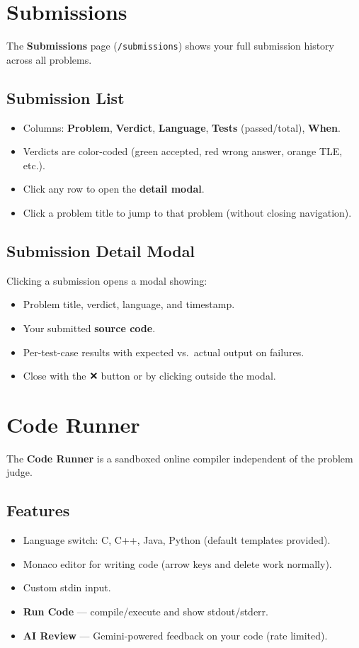 \documentclass[11pt,a4paper]{article}
\begin{document}
\section{Submissions}

The \textbf{Submissions} page (\texttt{/submissions}) shows your full submission history across all problems.

\subsection{Submission List}
\begin{itemize}[noitemsep]
  \item Columns: \textbf{Problem}, \textbf{Verdict}, \textbf{Language}, \textbf{Tests} (passed/total), \textbf{When}.
  \item Verdicts are color-coded (green accepted, red wrong answer, orange TLE, etc.).
  \item Click any row to open the \textbf{detail modal}.
  \item Click a problem title to jump to that problem (without closing navigation).
\end{itemize}

\subsection{Submission Detail Modal}
Clicking a submission opens a modal showing:
\begin{itemize}[noitemsep]
  \item Problem title, verdict, language, and timestamp.
  \item Your submitted \textbf{source code}.
  \item Per-test-case results with expected vs.\ actual output on failures.
  \item Close with the \textbf{✕} button or by clicking outside the modal.
\end{itemize}

\section{Code Runner}

The \textbf{Code Runner} is a sandboxed online compiler independent of the problem judge.

\subsection{Features}
\begin{itemize}[noitemsep]
  \item Language switch: C, C++, Java, Python (default templates provided).
  \item Monaco editor for writing code (arrow keys and delete work normally).
  \item Custom stdin input.
  \item \textbf{Run Code} --- compile/execute and show stdout/stderr.
  \item \textbf{AI Review} --- Gemini-powered feedback on your code (rate limited).
\end{itemize}
\end{document}
